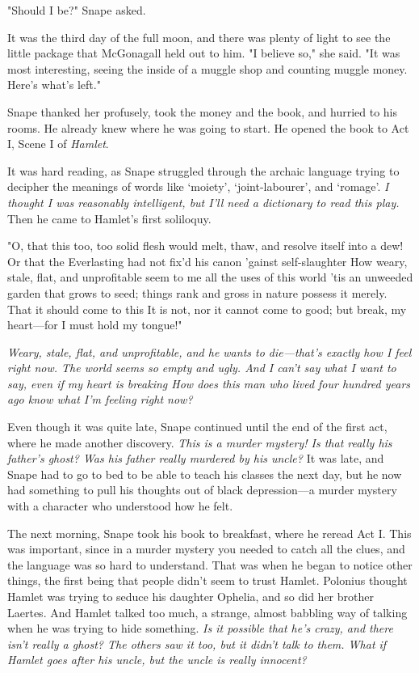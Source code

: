 "Should I be?" Snape asked.

It was the third day of the full moon, and there was plenty of light to see the little package that McGonagall held out to him. "I believe so," she said. "It was most interesting, seeing the inside of a muggle shop and counting muggle money. Here's what's left."

Snape thanked her profusely, took the money and the book, and hurried to his rooms. He already knew where he was going to start. He opened the book to Act I, Scene I of \emph{Hamlet}.

It was hard reading, as Snape struggled through the archaic language trying to decipher the meanings of words like `moiety', `joint-labourer', and `romage'. \emph{I thought I was reasonably intelligent, but I'll need a dictionary to read this play.} Then he came to Hamlet's first soliloquy.

"O, that this too, too solid flesh would melt, thaw, and resolve itself into a dew! Or that the Everlasting had not fix'd his canon 'gainst self-slaughter{\el} How weary, stale, flat, and unprofitable seem to me all the uses of this world{\el} 'tis an unweeded garden that grows to seed; things rank and gross in nature possess it merely. That it should come to this{\el} It is not, nor it cannot come to good; but break, my heart—for I must hold my tongue!"

\emph{Weary, stale, flat, and unprofitable, and he wants to die—that's exactly how I feel right now. The world seems so empty and ugly. And I can't say what I want to say, even if my heart is breaking{\el} How does this man who lived four hundred years ago know what I'm feeling right now?}

Even though it was quite late, Snape continued until the end of the first act, where he made another discovery. \emph{This is a murder mystery! Is that really his father's ghost? Was his father really murdered by his uncle?} It was late, and Snape had to go to bed to be able to teach his classes the next day, but he now had something to pull his thoughts out of black depression—a murder mystery with a character who understood how he felt.

The next morning, Snape took his book to breakfast, where he reread Act I. This was important, since in a murder mystery you needed to catch all the clues, and the language was so hard to understand. That was when he began to notice other things, the first being that people didn't seem to trust Hamlet. Polonius thought Hamlet was trying to seduce his daughter Ophelia, and so did her brother Laertes. And Hamlet talked too much, a strange, almost babbling way of talking when he was trying to hide something. \emph{Is it possible that he's crazy, and there isn't really a ghost? The others saw it too, but it didn't talk to them. What if Hamlet goes after his uncle, but the uncle is really innocent?}


